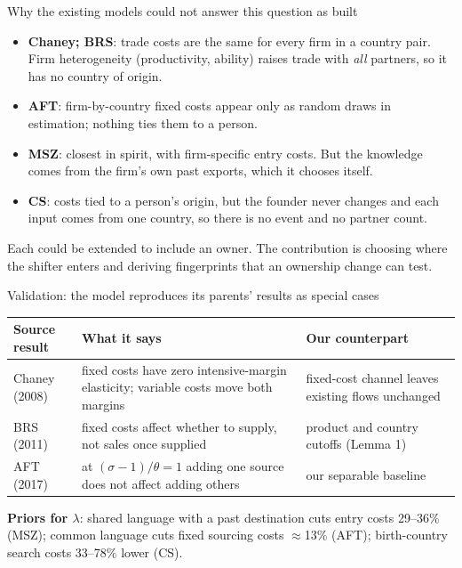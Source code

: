 \documentclass[11pt,aspectratio=169,notes]{beamer}
\begin{document}
\begin{frame}{Why the existing models could not answer this question as built}
\vspace{0.2cm}
\small
\begin{itemize}\setlength{\itemsep}{6pt}
\item \textbf{Chaney; BRS}: trade costs are the same for every firm in a country pair. Firm heterogeneity (productivity, ability) raises trade with \emph{all} partners, so it has no country of origin.
\item \textbf{AFT}: firm-by-country fixed costs appear only as random draws in estimation; nothing ties them to a person.
\item \textbf{MSZ}: closest in spirit, with firm-specific entry costs. But the knowledge comes from the firm's own past exports, which it chooses itself.
\item \textbf{CS}: costs tied to a person's origin, but the founder never changes and each input comes from one country, so there is no event and no partner count.
\end{itemize}
\vspace{0.15cm}
{\color{inksoft}\small Each could be extended to include an owner. The contribution is choosing where the shifter enters and deriving fingerprints that an ownership change can test.}
\end{frame}

\begin{frame}{Validation: the model reproduces its parents' results as special cases}
\footnotesize
\renewcommand{\arraystretch}{1.15}
\begin{tabularx}{\textwidth}{@{}>{\raggedright\arraybackslash}p{2.6cm}X>{\raggedright\arraybackslash}p{3.8cm}@{}}
\toprule
\textbf{Source result} & \textbf{What it says} & \textbf{Our counterpart}\\
\midrule
Chaney (2008) & fixed costs have zero intensive-margin elasticity; variable costs move both margins & fixed-cost channel leaves existing flows unchanged\\
BRS (2011) & fixed costs affect whether to supply, not sales once supplied & product and country cutoffs (Lemma 1)\\
AFT (2017) & at $(\sigma-1)/\theta=1$ adding one source does not affect adding others & our separable baseline\\
\bottomrule
\end{tabularx}
\vspace{0.15cm}
\textbf{Priors for $\lambda$}: shared language with a past destination cuts entry costs 29--36\% (MSZ); common language cuts fixed sourcing costs $\approx$13\% (AFT); birth-country search costs 33--78\% lower (CS).
\end{frame}
\end{document}
